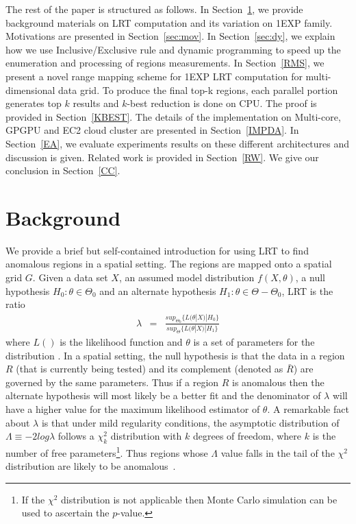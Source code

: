 \documentclass[AMA,LATO1COL]{WileyNJD-v2}
\begin{document}
The rest of the paper is structured as follows. In Section~\ref{BG}, we provide
background materials on LRT computation and its variation on 1EXP family. Motivations are presented in Section~\ref{sec:mov}. In Section~\ref{sec:dy}, we explain how we use
Inclusive/Exclusive rule and dynamic programming to speed up the enumeration and
processing of regions measurements. In Section~\ref{RMS}, we present a novel range mapping scheme for 1EXP LRT computation for multi-dimensional data grid.  To produce the final top-k regions, each parallel portion generates top $k$ results and $k$-best reduction is done on CPU. The proof is provided in Section~\ref{KBEST}. The details of the implementation on Multi-core, GPGPU and EC2 cloud cluster are presented in
Section~\ref{IMPDA}. In Section~\ref{EA}, we evaluate experiments results on these different architectures and discussion is given. Related
work is provided in Section~\ref{RW}. We give our conclusion in
Section~\ref{CC}.

\section{Background}\label{BG}

We provide a brief but self-contained introduction for using LRT
to find anomalous regions in a spatial setting. The regions are mapped onto a spatial grid $G$. Given a data set $X$, an assumed model distribution $f(X,\theta)$, a null hypothesis $H_{0}: \theta \in \Theta_0 $ and an alternate hypothesis $H_{1}: \theta \in {\Theta-\Theta_0}$, LRT is the ratio
\begin{eqnarray}\label{eq}
\lambda &=& \frac{ sup_{\Theta_0}\{L(\theta|X)|H_{0}\}}
{sup_{\Theta}\{L(\theta|X)|H_{1}\}}
\end{eqnarray}
where $L()$ is the likelihood function and  $\theta$ is a set of parameters
for the distribution \cite{jour}. In a spatial setting, the null hypothesis is that the data in a region $R$ (that is currently being tested) and
its complement (denoted as $\bar R$) are governed by the same
parameters. Thus if a region $R$ is anomalous then the alternate hypothesis will most likely be a better fit and the denominator of $\lambda$ will have a higher value for the maximum likelihood estimator of $\theta$.  A remarkable fact about $\lambda$ is that under mild regularity conditions, the asymptotic distribution of $\Lambda \equiv -2log\lambda$ follows a $ \chi ^{2}_{k}$ distribution with $k$ degrees of freedom, where
$k$ is the number of free parameters\footnote{If the $\chi^{2}$ distribution is not applicable then Monte Carlo simulation can be used to ascertain the $p$-value.}. Thus regions whose $\Lambda$ value falls in the tail of the $\chi^{2}$ distribution are likely to be anomalous~\cite{jour}.
\end{document}
